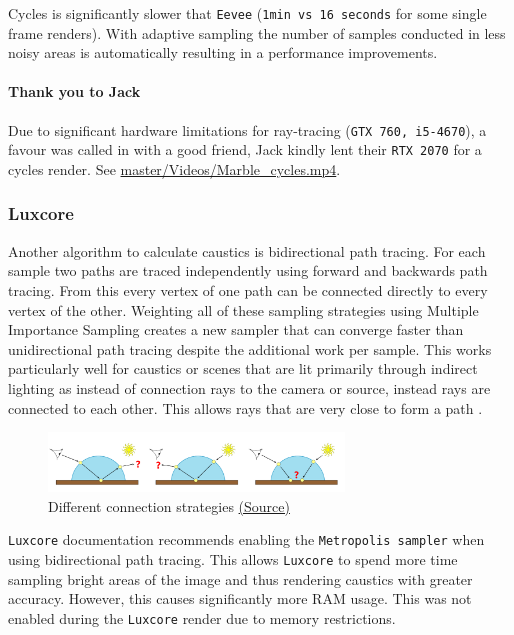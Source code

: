 \documentclass[11pt]{article}
\begin{document}
Cycles is significantly slower that \texttt{Eevee} (\texttt{1min vs 16 seconds} for some single
frame renders). With adaptive sampling the number of samples conducted in less
noisy areas is automatically resulting in a performance improvements.
\paragraph{Thank you to Jack}
\label{sec:orgabc6283}
Due to significant hardware limitations for ray-tracing (\texttt{GTX 760, i5-4670}), a
favour was called in with a good friend, Jack kindly lent their \texttt{RTX 2070}  for a
cycles render. See \href{https://github.com/Jake-Moss/blender-chess/blob/master/Videos/Marble\_cycles.mp4}{master/Videos/Marble\_cycles.mp4}.
\subsubsection{Luxcore}
\label{sec:org6d89f0c}
Another algorithm to calculate caustics is bidirectional path tracing. For each
sample two paths are traced independently using forward and backwards path tracing.
From this every vertex of one path can be connected directly to every vertex of
the other. Weighting all of these sampling strategies using Multiple Importance
Sampling creates a new sampler that can converge faster than unidirectional path
tracing despite the additional work per sample. This works particularly well for
caustics or scenes that are lit primarily through indirect lighting as instead
of connection rays to the camera or source, instead rays are connected to
each other. This allows rays that are very close to form a path \cite{Caustic-Connection}.

\begin{figure}[htbp]
\centering
\includegraphics[width=0.7\textwidth]{Images/bidirectional diagram.png}
\caption{\label{bidirectional}Different connection strategies \href{https://graphics.pixar.com/library/CausticConnections/paper.pdf}{(Source)}}
\end{figure}

\texttt{Luxcore} documentation recommends enabling the \texttt{Metropolis sampler} when using
bidirectional path tracing. This allows \texttt{Luxcore} to spend more time sampling
bright areas of the image and thus rendering caustics with greater accuracy.
However, this causes significantly more RAM usage. This was not enabled during
the \texttt{Luxcore} render due to memory restrictions.\\
\end{document}
